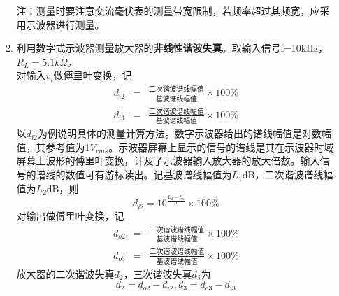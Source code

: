 \documentclass[a4paper]{article}
\begin{document}
\begin{enumerate}
\begin{enumerate}
注：测量时要注意交流毫伏表的测量带宽限制，若频率超过其频宽，应采用示波器进行测量。

\item 利用数字式示波器测量放大器的\textbf{非线性谐波失真}。取输入信号f=10kHz，$R_L = 5.1k\Omega$。\\
对输入$v_i$做傅里叶变换，记
\begin{eqnarray}
d_{i2} &=& \frac{\text{二次谐波谱线幅值}}{\text{基波谱线幅值}}\times 100\%\\
d_{i3} &=& \frac{\text{二次谐波谱线幅值}}{\text{基波谱线幅值}}\times 100\%
\end{eqnarray}
以$d_{i2}$为例说明具体的测量计算方法。数字示波器给出的谱线幅值是对数幅值，其参考值为1$V_{rms}$。示波器屏幕上显示的信号的谱线是其在示波器时域屏幕上波形的傅里叶变换，计及了示波器输入放大器的放大倍数。输入信号的谱线的数值可有游标读出。记基波谱线幅值为$L_1$dB，二次谐波谱线幅值为$L_2$dB，则
\begin{equation}
d_{i2} = 10^{\frac{L_2-L_1}{20}}\times 100\%
\end{equation}
对输出做傅里叶变换，记
\begin{eqnarray}
d_{o2} &=& \frac{\text{二次谐波谱线幅值}}{\text{基波谱线幅值}}\times 100\%\\
d_{o3} &=& \frac{\text{二次谐波谱线幅值}}{\text{基波谱线幅值}}\times 100\%
\end{eqnarray}
放大器的二次谐波失真$d_2$，三次谐波失真$d_3$为
\begin{equation}
d_2 = d_{o2}-d_{i2}, d_3 = d_{o3}-d_{i3}
\end{equation}


\end{enumerate}
\end{enumerate}
\end{document}
